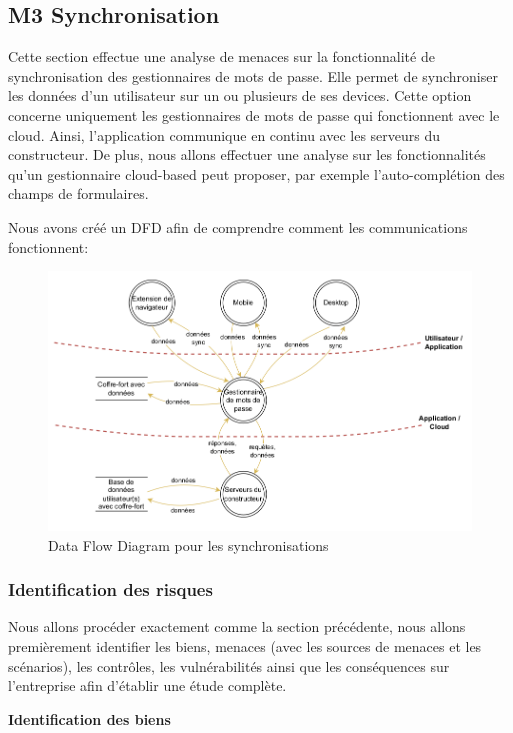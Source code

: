 \subsection{M3 Synchronisation}

Cette section effectue une analyse de menaces sur la fonctionnalité de synchronisation des gestionnaires de mots de passe. Elle permet de synchroniser les données d'un utilisateur sur un ou plusieurs de ses devices. Cette option concerne uniquement les gestionnaires de mots de passe qui fonctionnent avec le cloud. Ainsi, l'application communique en continu avec les serveurs du constructeur. De plus, nous allons effectuer une analyse sur les fonctionnalités qu'un gestionnaire cloud-based peut proposer, par exemple l'auto-complétion des champs de formulaires.

Nous avons créé un DFD afin de comprendre comment les communications fonctionnent:

\begin{figure}[H]
	\includegraphics[width=13cm]{images/dfd_sync.png}
	\centering
	\caption{Data Flow Diagram pour les synchronisations}
\end{figure}

\subsubsection{Identification des risques}

Nous allons procéder exactement comme la section précédente, nous allons premièrement identifier les biens, menaces (avec les sources de menaces et les scénarios), les contrôles, les vulnérabilités ainsi que les conséquences sur l'entreprise afin d'établir une étude complète.

\textbf{Identification des biens}

